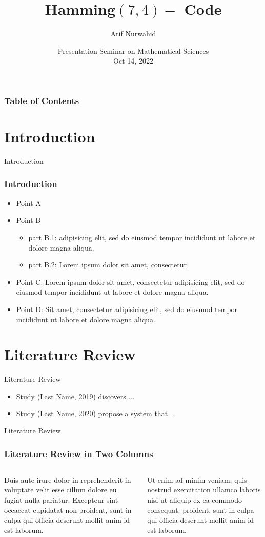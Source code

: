 \documentclass[10pt]{beamer}
\title[Hamming$(7,4)-$ Code]{Hamming$(7,4)-$ Code}
\author[Arif Nurwahid]{Arif Nurwahid\inst{1}}%
\institute[愛媛大学]{Graduate School of Science and Engineering, Ehime University\inst{1}}
\date[\textcolor{ehimeColor2}{Mathematical Science, 2022}]
{Presentation Seminar on Mathematical Sciences\\
Oct 14, 2022}
\begin{document}
\frame{\titlepage}
\begin{frame}
\frametitle{Table of Contents}
\tableofcontents
\end{frame}

\section{Introduction}
    \begin{frame}{Introduction}
    \frametitle{Introduction}
        \begin{itemize}
            \item Point A
            \item Point B
        \begin{itemize}
            \item part B.1: adipisicing elit, sed do eiusmod tempor incididunt ut labore et dolore magna aliqua.
            \item part B.2: Lorem ipsum dolor sit amet, consectetur 
        \end{itemize}
            \item Point C: Lorem ipsum dolor sit amet, consectetur adipisicing elit, sed do eiusmod tempor incididunt ut labore et dolore magna aliqua.
            \item Point D: Sit amet, consectetur adipisicing elit, sed do eiusmod tempor incididunt ut labore et dolore magna aliqua.
        \end{itemize}
    \end{frame}
\section{Literature Review}

\begin{frame}{Literature Review}
    
	
    \begin{itemize}
        \item  Study (Last Name, 2019) discovers ...
        \item  Study (Last Name, 2020) propose a system that ...
    \end{itemize}
\end{frame}

\begin{frame}{Literature Review}
    \frametitle{Literature Review in Two Columns}
    \begin{columns}
    
    Duis aute irure dolor in reprehenderit in voluptate velit esse cillum dolore eu fugiat nulla pariatur. Excepteur sint occaecat cupidatat non proident, sunt in culpa qui officia deserunt mollit anim id est laborum.
    
    Ut enim ad minim veniam, quis nostrud exercitation ullamco laboris nisi ut aliquip ex ea commodo consequat. proident, sunt in culpa qui officia deserunt mollit anim id est laborum.
    
    \end{columns}
\end{frame}
\end{document}
